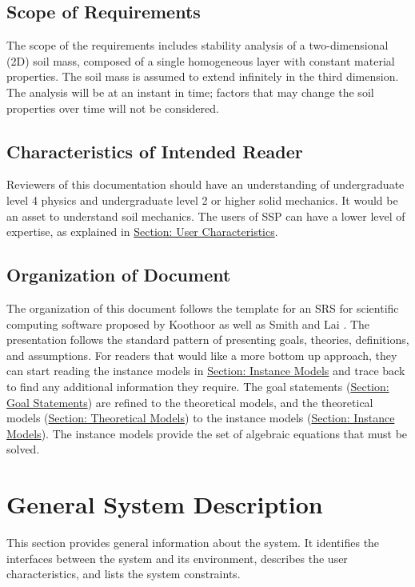 \documentclass[12pt]{article}
\begin{document}
\subsection{Scope of Requirements}
\label{Sec:ReqsScope}
The scope of the requirements includes stability analysis of a two-dimensional (2D) soil mass, composed of a single homogeneous layer with constant material properties. The soil mass is assumed to extend infinitely in the third dimension. The analysis will be at an instant in time; factors that may change the soil properties over time will not be considered.
\subsection{Characteristics of Intended Reader}
\label{Sec:ReaderChars}
Reviewers of this documentation should have an understanding of undergraduate level 4 physics and undergraduate level 2 or higher solid mechanics. It would be an asset to understand soil mechanics. The users of SSP can have a lower level of expertise, as explained in \hyperref[Sec:UserChars]{Section: User Characteristics}.
\subsection{Organization of Document}
\label{Sec:DocOrg}
The organization of this document follows the template for an SRS for scientific computing software proposed by Koothoor \cite{koothoor2013} as well as Smith and Lai \cite{smithLai2005}. The presentation follows the standard pattern of presenting goals, theories, definitions, and assumptions. For readers that would like a more bottom up approach, they can start reading the instance models in \hyperref[Sec:IMs]{Section: Instance Models} and trace back to find any additional information they require.
The goal statements (\hyperref[Sec:GoalStmt]{Section: Goal Statements}) are refined to the theoretical models, and the theoretical models (\hyperref[Sec:TMs]{Section: Theoretical Models}) to the instance models (\hyperref[Sec:IMs]{Section: Instance Models}). The instance models provide the set of algebraic equations that must be solved.
\section{General System Description}
\label{Sec:GenSysDesc}
This section provides general information about the system. It identifies the interfaces between the system and its environment, describes the user characteristics, and lists the system constraints.
\end{document}
